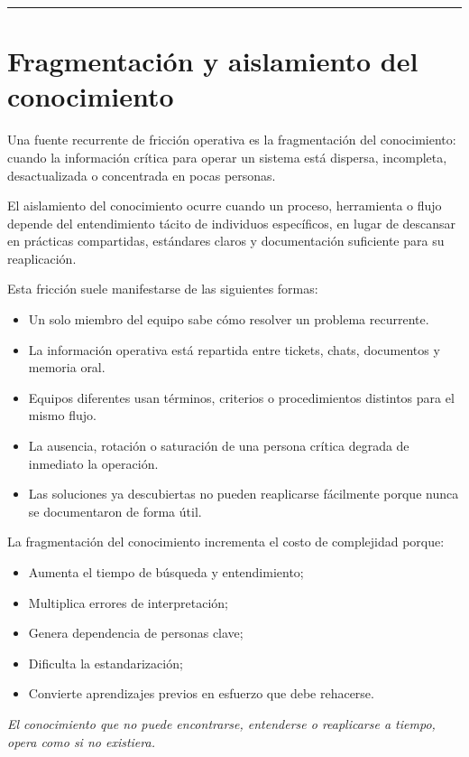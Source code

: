 \hrule
\section{Fragmentación y aislamiento del conocimiento}
Una fuente recurrente de fricción operativa es la fragmentación del conocimiento: cuando la información crítica para operar un sistema está dispersa, incompleta, desactualizada o concentrada en pocas personas.

El aislamiento del conocimiento ocurre cuando un proceso, herramienta o flujo depende del entendimiento tácito de individuos específicos, en lugar de descansar en prácticas compartidas, estándares claros y documentación suficiente para su reaplicación.

Esta fricción suele manifestarse de las siguientes formas:

\begin{itemize}
    \item Un solo miembro del equipo sabe cómo resolver un problema recurrente.
    \item La información operativa está repartida entre tickets, chats, documentos y memoria oral.
    \item Equipos diferentes usan términos, criterios o procedimientos distintos para el mismo flujo.
    \item La ausencia, rotación o saturación de una persona crítica degrada de inmediato la operación.
    \item Las soluciones ya descubiertas no pueden reaplicarse fácilmente porque nunca se documentaron de forma útil.
\end{itemize}

La fragmentación del conocimiento incrementa el costo de complejidad porque:
\begin{itemize}
    \item Aumenta el tiempo de búsqueda y entendimiento;
	\item Multiplica errores de interpretación;
	\item Genera dependencia de personas clave;
	\item Dificulta la estandarización;
	\item Convierte aprendizajes previos en esfuerzo que debe rehacerse.
\end{itemize}

{\epigraph{\textit{El conocimiento que no puede encontrarse, entenderse o reaplicarse a tiempo, opera como si no existiera.}}{}}
